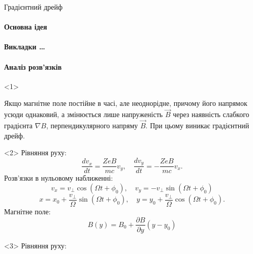 \documentclass[]{beamer}
\begin{document}
\begin{frame}{Градієнтний дрейф}{}
	\framesubtitle<1>{Основна ідея}
	\framesubtitle<2-4>{Викладки \ldots}
	\framesubtitle<5>{Аналіз розв'язків}
	\begin{onlyenv}
		\begin{block}{}\justifying
			Якщо магнітне поле постійне в часі, але неоднорідне, причому його напрямок усюди однаковий, а змінюється лише напруженість $ \vec{B} $ через наявність слабкого градієнта $\nabla B$, перпендикулярного напряму $\vec{B}$. При цьому виникає \alert{ градієнтний дрейф}.
		\end{block}
		\begin{center}
			
		\end{center}
	\end{onlyenv}
	\begin{onlyenv}\small
		Рівняння руху:
		\begin{equation*}
			\frac{dv_x}{dt} = \frac{ZeB}{mc}v_y, \quad
			\frac{dv_y}{dt} = -\frac{ZeB}{mc} v_x.
		\end{equation*}
		Розв'язки в нульовому наближенні:
		\begin{equation*}
			v_x  = v_\perp\cos(\Omega t + \phi_0),  \quad
			v_y  = - v_\perp\sin(\Omega t + \phi_0)
		\end{equation*}
		\begin{equation*}
			x = x_0 + \frac{v_\perp}{\Omega} \sin(\Omega t + \phi_0), \quad
			y = y_0 + \frac{v_\perp}{\Omega} \cos(\Omega t + \phi_0).
		\end{equation*}
		Магнітне поле:
		\begin{equation*}
			B(y) = B_0 + \frac{\partial B}{\partial y} (y - y_0)
		\end{equation*}
	\end{onlyenv}
	\begin{onlyenv}\small
		Рівняння руху:
		\begin{align*}

\end{align*}
\end{onlyenv}
\end{frame}
\end{document}
